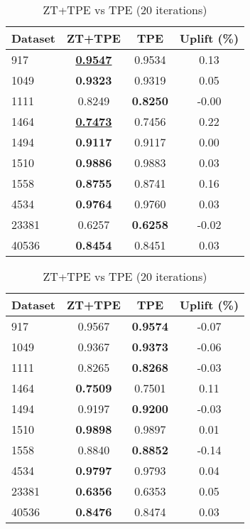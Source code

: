 \begin{table}[htbp]
\begin{center}
\begin{small}
\begin{sc}
\begin{subtable}[t]{0.48\textwidth}
    \centering
    \caption{ZT+TPE vs TPE (10 iterations)}
    \label{tab:randomforest-optuna-10}
    \begin{tabular}{lccc}
    \toprule
    \textbf{Dataset} & \textbf{ZT+TPE} & \textbf{TPE} & \textbf{Uplift (\%)} \\
    \midrule
    917    & \underline{\textbf{0.9547}} & 0.9534 & 0.13 \\
    1049    & \textbf{0.9323} & 0.9319 & 0.05 \\
    1111    & 0.8249 & \textbf{0.8250} & -0.00 \\
    1464    & \underline{\textbf{0.7473}} & 0.7456 & 0.22 \\
    1494    & \textbf{0.9117} & 0.9117 & 0.00 \\
    1510    & \textbf{0.9886} & 0.9883 & 0.03 \\
    1558    & \textbf{0.8755} & 0.8741 & 0.16 \\
    4534    & \textbf{0.9764} & 0.9760 & 0.03 \\
    23381    & 0.6257 & \textbf{0.6258} & -0.02 \\
    40536    & \textbf{0.8454} & 0.8451 & 0.03 \\
    \bottomrule
    \end{tabular}
\end{subtable}
\hfill
\begin{subtable}[t]{0.48\textwidth}
    \centering
    \caption{ZT+TPE vs TPE (20 iterations)}
    \label{tab:randomforest-optuna-20}
    \begin{tabular}{lccc}
    \toprule
    \textbf{Dataset} & \textbf{ZT+TPE} & \textbf{TPE} & \textbf{Uplift (\%)} \\
    \midrule
    917    & 0.9567 & \textbf{0.9574} & -0.07 \\
    1049    & 0.9367 & \textbf{0.9373} & -0.06 \\
    1111    & 0.8265 & \textbf{0.8268} & -0.03 \\
    1464    & \textbf{0.7509} & 0.7501 & 0.11 \\
    1494    & 0.9197 & \textbf{0.9200} & -0.03 \\
    1510    & \textbf{0.9898} & 0.9897 & 0.01 \\
    1558    & 0.8840 & \textbf{0.8852} & -0.14 \\
    4534    & \textbf{0.9797} & 0.9793 & 0.04 \\
    23381    & \textbf{0.6356} & 0.6353 & 0.05 \\
    40536    & \textbf{0.8476} & 0.8474 & 0.03 \\
    \bottomrule
    \end{tabular}
\end{subtable}

\end{sc}
\end{small}
\end{center}
\vskip -0.1in
\end{table}